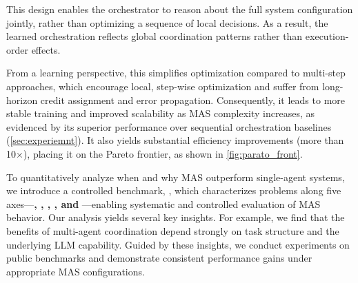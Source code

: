 This design enables the orchestrator to reason about the full system configuration jointly, rather than optimizing a sequence of local decisions. As a result, the learned orchestration reflects global coordination patterns rather than execution-order effects. {From a learning perspective, this simplifies optimization compared
to multi-step approaches, which encourage local, step-wise optimization and
suffer from long-horizon credit assignment and error propagation. Consequently,
it leads to more stable training and improved scalability as MAS
complexity increases{, as evidenced by its superior performance over sequential orchestration baselines  (\cref{sec:experiemnt}).} {It also yields substantial efficiency improvements (more than 10$\times$), placing it on the Pareto frontier, as shown in \cref{fig:parato_front}.}


To quantitatively analyze when and why MAS outperform single-agent systems, we introduce a controlled benchmark, \ourbenchmark, which characterizes problems along five axes—\textbf{\depth, \horizon, \breadth, \myparallel, and \robustness}—enabling systematic and controlled evaluation of MAS behavior.
Our analysis yields several key insights. For example, we find that the benefits of multi-agent coordination depend strongly on {task structure and the underlying LLM capability}. Guided by these insights, we conduct experiments on public benchmarks and demonstrate consistent performance gains under appropriate MAS configurations. 

}
